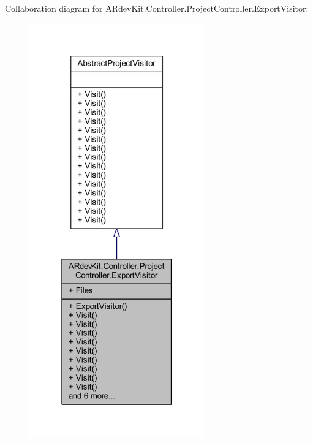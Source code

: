 Collaboration diagram for A\-Rdev\-Kit.\-Controller.\-Project\-Controller.\-Export\-Visitor\-:
\nopagebreak
\begin{figure}[H]
\begin{center}
\leavevmode
\includegraphics[width=214pt]{class_a_rdev_kit_1_1_controller_1_1_project_controller_1_1_export_visitor__coll__graph}
\end{center}
\end{figure}
